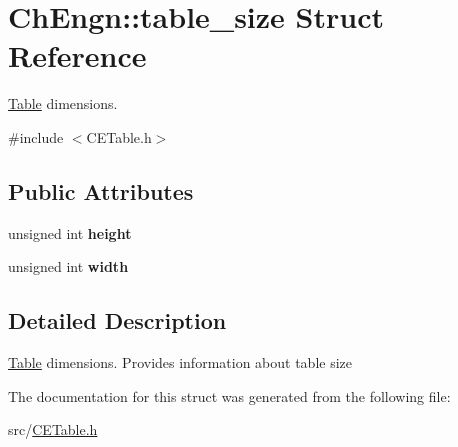 \hypertarget{structChEngn_1_1table__size}{
\section{ChEngn::table\_\-size Struct Reference}
\label{structChEngn_1_1table__size}
}


\hyperlink{classChEngn_1_1Table}{Table} dimensions.  




{\ttfamily \#include $<$CETable.h$>$}

\subsection*{Public Attributes}
\begin{DoxyCompactItemize}
\item 
\hypertarget{structChEngn_1_1table__size_a46d85ce1d0feba8f8efb618e8ad5d938}{
unsigned int {\bfseries height}}
\label{structChEngn_1_1table__size_a46d85ce1d0feba8f8efb618e8ad5d938}

\item 
\hypertarget{structChEngn_1_1table__size_aaf5f89ec7c6a2de514cfe4a1a606b8be}{
unsigned int {\bfseries width}}
\label{structChEngn_1_1table__size_aaf5f89ec7c6a2de514cfe4a1a606b8be}

\end{DoxyCompactItemize}


\subsection{Detailed Description}
\hyperlink{classChEngn_1_1Table}{Table} dimensions. Provides information about table size 

The documentation for this struct was generated from the following file:\begin{DoxyCompactItemize}
\item 
src/\hyperlink{CETable_8h}{CETable.h}\end{DoxyCompactItemize}
